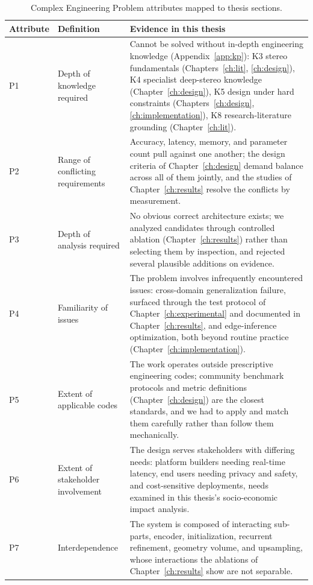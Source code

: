 \begin{table}[!htbp]
\centering
\caption{Complex Engineering Problem attributes mapped to thesis sections.}
\label{tab:cep_attributes}
\small
\begin{tabular}{lp{4.2cm}p{7.2cm}}
\toprule
Attribute & Definition & Evidence in this thesis\\
\midrule
P1 & Depth of knowledge required & Cannot be solved without in-depth engineering knowledge (Appendix~\ref{app:kp}): K3 stereo fundamentals (Chapters~\ref{ch:lit}, \ref{ch:design}), K4 specialist deep-stereo knowledge (Chapter~\ref{ch:design}), K5 design under hard constraints (Chapters~\ref{ch:design}, \ref{ch:implementation}), K8 research-literature grounding (Chapter~\ref{ch:lit}).\\
P2 & Range of conflicting requirements & Accuracy, latency, memory, and parameter count pull against one another; the design criteria of Chapter~\ref{ch:design} demand balance across all of them jointly, and the studies of Chapter~\ref{ch:results} resolve the conflicts by measurement.\\
P3 & Depth of analysis required & No obvious correct architecture exists; we analyzed candidates through controlled ablation (Chapter~\ref{ch:results}) rather than selecting them by inspection, and rejected several plausible additions on evidence.\\
P4 & Familiarity of issues & The problem involves infrequently encountered issues: cross-domain generalization failure, surfaced through the test protocol of Chapter~\ref{ch:experimental} and documented in Chapter~\ref{ch:results}, and edge-inference optimization, both beyond routine practice (Chapter~\ref{ch:implementation}).\\
P5 & Extent of applicable codes & The work operates outside prescriptive engineering codes; community benchmark protocols and metric definitions (Chapter~\ref{ch:design}) are the closest standards, and we had to apply and match them carefully rather than follow them mechanically.\\
P6 & Extent of stakeholder involvement & The design serves stakeholders with differing needs: platform builders needing real-time latency, end users needing privacy and safety, and cost-sensitive deployments, needs examined in this thesis's socio-economic impact analysis.\\
P7 & Interdependence & The system is composed of interacting sub-parts, encoder, initialization, recurrent refinement, geometry volume, and upsampling, whose interactions the ablations of Chapter~\ref{ch:results} show are not separable.\\
\bottomrule
\end{tabular}
\end{table}

